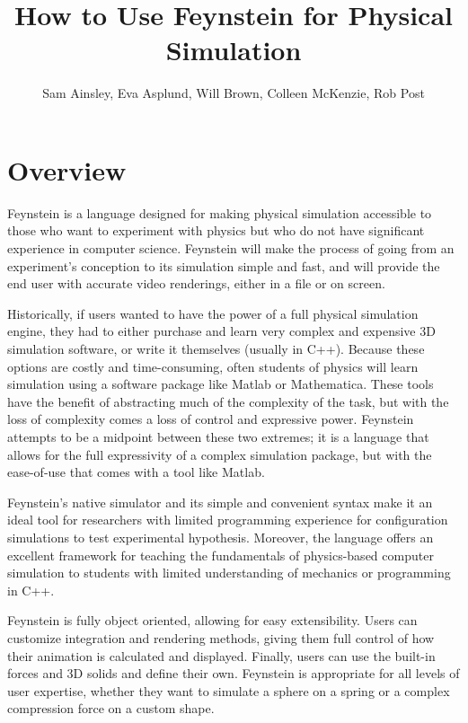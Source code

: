 \documentclass[letterpaper]{article}
\title{How to Use Feynstein for Physical Simulation}
\author{Sam Ainsley, Eva Asplund, Will Brown, Colleen McKenzie, Rob
  Post}
\begin{document}
 
\maketitle

\tableofcontents

\newpage
\section{Overview}

Feynstein is a language designed for making physical simulation
accessible to those who want to experiment with physics but who do not
have significant experience in computer science. Feynstein will make
the process of going from an experiment's conception to its simulation
simple and fast, and will provide the end user with accurate video
renderings, either in a file or on screen.

Historically, if users wanted to have the power of a full physical
simulation engine, they had to either purchase and learn very complex
and expensive 3D simulation software, or write it themselves (usually
in C++). Because these options are costly and time-consuming, often
students of physics will learn simulation using a software package
like Matlab or Mathematica. These tools have the benefit of
abstracting much of the complexity of the task, but with the loss of
complexity comes a loss of control and expressive power. Feynstein
attempts to be a midpoint between these two extremes; it is a language
that allows for the full expressivity of a complex simulation package,
but with the ease-of-use that comes with a tool like Matlab.

Feynstein's native simulator and its simple and convenient syntax make
it an ideal tool for researchers with limited programming experience
for configuration simulations to test experimental
hypothesis. Moreover, the language offers an excellent framework for
teaching the fundamentals of physics-based computer simulation to
students with limited understanding of mechanics or programming in
C++.

Feynstein is fully object oriented, allowing for easy
extensibility. Users can customize integration and rendering methods,
giving them full control of how their animation is calculated and
displayed. Finally, users can use the built-in forces and 3D solids
and define their own. Feynstein is appropriate for all levels of user
expertise, whether they want to simulate a sphere on a spring or a
complex compression force on a custom shape.
\end{document}
